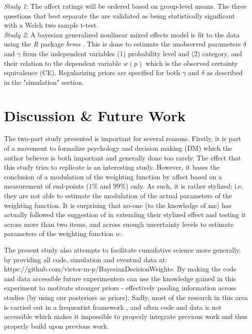 \documentclass[12pt]{article}
\begin{document}
\emph{Study 1}: The affect ratings will be
ordered based on group-level means. The
three questions that best separate the
are validated as being statistically significant
with a Welch two sample t-test. \\

\emph{Study 2}: A bayesian generalized nonlinear
mixed effects model is fit to the data using the
\emph{R} package \emph{brms} \autocite{brms}.
This is done to estimate the unobserved parameters
$\delta$ and $\gamma$ from the independent variables
(1) probability level and (2) category,
and their relation to the dependent variable
$w(p)$ which is the observed certainty equivalence (CE).
Regularizing priors are specified for both
$\gamma$ and $\delta$ as described in the
"simulation" section.

\section{Discussion \& Future Work}

The two-part study presented is important
for several reasons. Firstly, it is part of
a movement to formalize psychology and decision
making (DM) which the author believes is both
important and generally done too rarely.
The effect that this study tries to replicate
\autocite{rottenstreich2001} is an interesting
study. However, it bases the conclusion of a
modulation of the weighting function
by affect based on a measurement of end-points
($1\%$ and $99\%$) only.
As such, it is rather stylized; i.e. they
are not able to estimate the modulation of
the actual parameters of the weighting function.
It is surprising that no-one (to the knowledge
of me) has actually followed the suggestion
of \autocite{rottenstreich2001} in extending
their stylized effect and testing it across
more than two items, and across enough uncertainty
levels to estimate parameters of the weighting
function $w$.

\vspace{3mm}
The present study also attempts to facilitate
cumulative science more generally, by providing
all code, simulation and eventual data at:
https://github.com/victor-m-p/BayesianDecisionWeights.
By making the code and data accessible future
experimenters can use the knowledge gained in
this experiment to motivate stronger priors -
effectively pooling information across studies
(by using our posteriors as priors). Sadly,
most of the research in this area is carried
out in a frequentist framework
\autocite{gonzalez1999shape, rottenstreich2001money,
hsee2004music}, and often
code and data is not accessible which makes it
impossible to properly integrate previous work
and thus properly build upon previous work.
\end{document}
